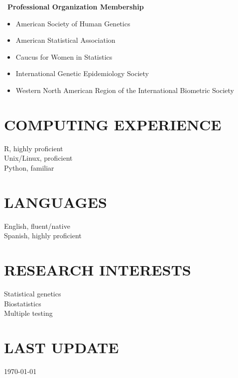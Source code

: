\documentclass[margin]{res}
\begin{document}
\begin{resume}
	\ \textbf{Professional Organization Membership} 
	\begin{itemize}	 \itemsep -2pt
	\item American Society of Human Genetics 
	\item American Statistical Association
	\item Caucus for Women in Statistics
	\item International Genetic Epidemiology Society 
	\item Western North American Region of the International Biometric Society \\
	\end{itemize}

\section{COMPUTING EXPERIENCE} R, highly proficient \\
							Unix/Linux, proficient \\
							Python, familiar \\
		

\section{LANGUAGES} English, fluent/native \\
					Spanish, highly proficient\\

\section{RESEARCH INTERESTS} Statistical genetics \\
							 Biostatistics \\
							 Multiple testing		\\
			
\section{LAST UPDATE} \today

\end{resume}
\end{document}
